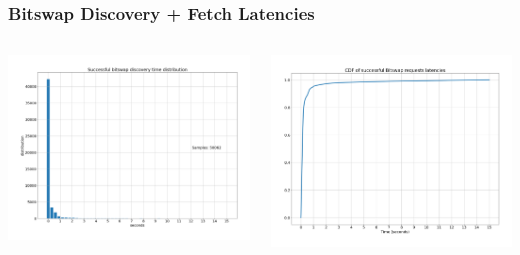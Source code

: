 \documentclass{pl-slide}
\begin{document}
\begin{frame}
\frametitle{Bitswap Discovery + Fetch Latencies}
\begin{columns}[onlytextwidth]
\begin{column}{0.49\textwidth}
    \begin{center}
		\includegraphics[width=\textwidth]{plots/pdf15.png}
    \end{center}
\end{column}
\begin{column}{0.49\textwidth}
    \begin{center}
		\includegraphics[width=\textwidth]{plots/cdf15.png}
    \end{center}
\end{column}
\end{columns}

\end{frame}
\end{document}
